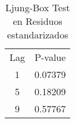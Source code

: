 \begin{table}[h]
 
\begin{center}
    

\begin{tabular}[!h]{ |c |  c |  } \hline
	
	\rowcolor{cyan} \multicolumn{2}{ |c| }{ \textbf{Ljung-Box Test en Residuos estandarizados }} \\ \hline
	 \hline
	

\rowcolor{red}   Lag & P-value \\\hline
	  
	                1	& 0.07379 \\\hline
                    5	& 0.18209  \\\hline
                    9	& 0.57767   \\\hline
                    
	
	\end{tabular}
      \caption{Ljung-Box Test en Residuos estandarizados}
	\label{Ljung-Box Test en Residuos estandarizados}
	
\end{center}

\end{table}